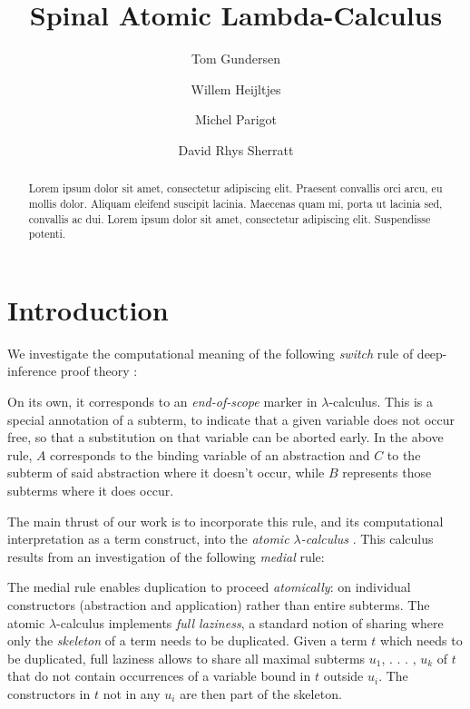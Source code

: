 \documentclass[a4paper,UKenglish,cleveref, autoref]{lipics-v2019}
\title{Spinal Atomic Lambda-Calculus} %
\author{Tom Gundersen}{Red Hat, Inc.}{teg@jklm.no}{}{}
\author{Willem Heijltjes}{University of Bath, England, UK \and \url{http://www.cs.bath.ac.uk/~wbh22/} }{w.b.heijltjes@bath.ac.uk}{}{}%
\author{Michel Parigot}{Laboratoire PPS, UMR 7126, CNRS \& Universit\'{e} Paris 7 (France)}{michel.parigot@gmail.com}{}{}
\author{David Rhys Sherratt}{Friedrich-Schiller University Jena, Germany}{david.rhys.sherratt@uni-jena.de
}{}{}
\begin{document}
\maketitle

\begin{abstract}
Lorem ipsum dolor sit amet, consectetur adipiscing elit. Praesent convallis orci arcu, eu mollis dolor. Aliquam eleifend suscipit lacinia. Maecenas quam mi, porta ut lacinia sed, convallis ac dui. Lorem ipsum dolor sit amet, consectetur adipiscing elit. Suspendisse potenti. 
\end{abstract}

\section{Introduction}

We investigate the computational meaning of the following \emph{switch} rule of deep-inference proof theory \cite{Tiu:06:A-System:ai, Guglielm07}:
\begin{center}
\end{center}
On its own, it corresponds to an \emph{end-of-scope} marker in $\lambda$-calculus. This is a special annotation of a subterm, to indicate that a given variable does not occur free, so that a substitution on that variable can be aborted early. In the above rule, $A$ corresponds to the binding variable of an abstraction and $C$ to the subterm of said abstraction where it doesn't occur, while $B$ represents those subterms where it does occur.

The main thrust of our work is to incorporate this rule, and its computational interpretation as a term construct, into the \emph{atomic $\lambda$-calculus} \cite{gundersen2013atomic}. This calculus results from an investigation of the following \emph{medial} rule:
\begin{center}
\end{center}
The medial rule enables duplication to proceed \emph{atomically}: on individual constructors (abstraction and application) rather than entire subterms. The atomic $\lambda$-calculus implements \emph{full laziness}, a standard notion of sharing where only the \emph{skeleton} of a term needs to be duplicated. Given a term $t$ which needs to be duplicated, full laziness allows to share all maximal subterms $u_{1}$, . . . , $u_{k}$ of $t$ that do not contain occurrences of a variable bound in $t$ outside $u_{i}$. The constructors in $t$ not in any $u_{i}$ are then part of the skeleton.
\end{document}
